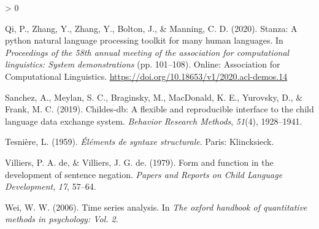 \documentclass[
  english,
  man,floatsintext]{apa6}
\newlength{\cslhangindent}
\newenvironment{CSLReferences}[2] %
 {%
  \setlength{\parindent}{0pt}
  \ifodd #1 \everypar{\setlength{\hangindent}{\cslhangindent}}\ignorespaces\fi
  \ifnum #2 > 0
  \setlength{\parskip}{#2\baselineskip}
  \fi
 }%
 {}
\begin{document}
\begin{CSLReferences}{1}{0}
\leavevmode\hypertarget{ref-qi-etal-2020-stanza}{}%
Qi, P., Zhang, Y., Zhang, Y., Bolton, J., \& Manning, C. D. (2020). {S}tanza: A python natural language processing toolkit for many human languages. In \emph{Proceedings of the 58th annual meeting of the association for computational linguistics: System demonstrations} (pp. 101--108). Online: Association for Computational Linguistics. \url{https://doi.org/10.18653/v1/2020.acl-demos.14}

\leavevmode\hypertarget{ref-sanchez2019childes}{}%
Sanchez, A., Meylan, S. C., Braginsky, M., MacDonald, K. E., Yurovsky, D., \& Frank, M. C. (2019). Childes-db: A flexible and reproducible interface to the child language data exchange system. \emph{Behavior Research Methods}, \emph{51}(4), 1928--1941.

\leavevmode\hypertarget{ref-dg}{}%
Tesnière, L. (1959). \emph{{É}l{é}ments de syntaxe structurale}. Paris: Klincksieck.

\leavevmode\hypertarget{ref-de1979form}{}%
Villiers, P. A. de, \& Villiers, J. G. de. (1979). Form and function in the development of sentence negation. \emph{Papers and Reports on Child Language Development}, \emph{17}, 57--64.

\leavevmode\hypertarget{ref-wei2006time}{}%
Wei, W. W. (2006). Time series analysis. In \emph{The oxford handbook of quantitative methods in psychology: Vol. 2}.

\end{CSLReferences}
\end{document}
